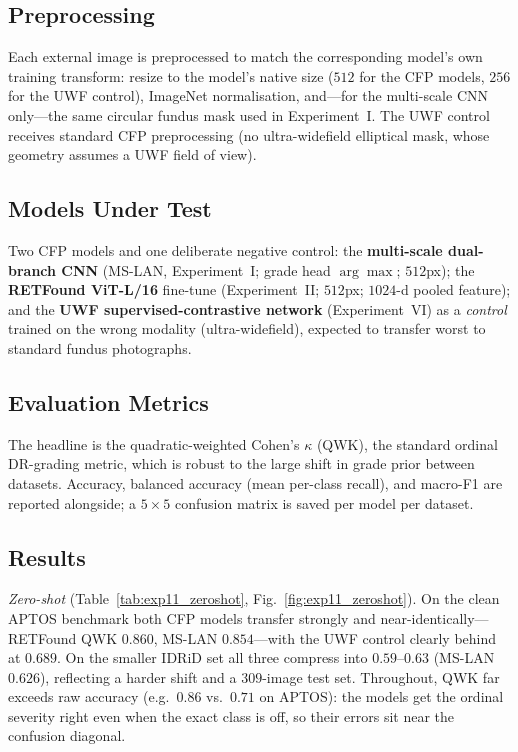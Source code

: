 \documentclass[journal,twoside,web]{ieeecolor}
\begin{document}
\subsection{Preprocessing}
Each external image is preprocessed to match the corresponding model's own training
transform: resize to the model's native size ($512$ for the CFP models, $256$ for the
UWF control), ImageNet normalisation, and---for the multi-scale CNN only---the same
circular fundus mask used in Experiment~I. The UWF control receives standard CFP
preprocessing (no ultra-widefield elliptical mask, whose geometry assumes a UWF field
of view).

\subsection{Models Under Test}
Two CFP models and one deliberate negative control: the \textbf{multi-scale
dual-branch CNN} (MS-LAN, Experiment~I; grade head $\arg\max$; $512$px); the
\textbf{RETFound ViT-L/16} fine-tune (Experiment~II; $512$px; $1024$-d pooled
feature); and the \textbf{UWF supervised-contrastive network} (Experiment~VI) as a
\emph{control} trained on the wrong modality (ultra-widefield), expected to transfer
worst to standard fundus photographs.

\subsection{Evaluation Metrics}
The headline is the quadratic-weighted Cohen's $\kappa$ (QWK), the standard ordinal
DR-grading metric, which is robust to the large shift in grade prior between datasets.
Accuracy, balanced accuracy (mean per-class recall), and macro-F1 are reported
alongside; a $5{\times}5$ confusion matrix is saved per model per dataset.

\subsection{Results}
\emph{Zero-shot} (Table~\ref{tab:exp11_zeroshot}, Fig.~\ref{fig:exp11_zeroshot}). On
the clean APTOS benchmark both CFP models transfer strongly and near-identically---%
RETFound QWK $\mathbf{0.860}$, MS-LAN $0.854$---with the UWF control clearly behind at
$0.689$. On the smaller IDRiD set all three compress into $0.59$--$0.63$ (MS-LAN
$\mathbf{0.626}$), reflecting a harder shift and a $309$-image test set. Throughout,
QWK far exceeds raw accuracy (e.g.\ $0.86$ vs.\ $0.71$ on APTOS): the models get the
ordinal severity right even when the exact class is off, so their errors sit near the
confusion diagonal.
\end{document}
